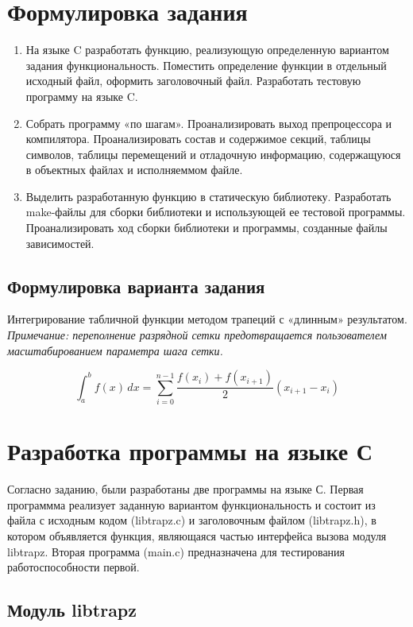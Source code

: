 






\section{Формулировка задания}
\begin{enumerate}
\item На языке C разработать функцию, реализующую определенную вариантом задания функциональность. Поместить определение функции в отдельный исходный файл, оформить заголовочный файл. Разработать тестовую программу на языке C.
\item Собрать программу «по шагам». Проанализировать выход препроцессора и компилятора. Проанализировать состав и содержимое секций, таблицы символов, таблицы перемещений и отладочную информацию, содержащуюся в объектных файлах и исполняеммом файле.
\item Выделить разработанную функцию в статическую библиотеку. Разработать make-файлы для сборки библиотеки и использующей ее тестовой программы. Проанализировать ход сборки библиотеки и программы, созданные файлы зависимостей.
\end{enumerate}

\subsection{ Формулировка варианта задания}
Интегрирование табличной функции методом трапеций с «длинным» результатом.
\textit{Примечание: переполнение разрядной сетки предотвращается пользователем масштабированием параметра шага сетки.}

\[ \int_{a}^{b} f(x) \,dx = \sum_{i=0}^{n-1} \frac{f(x_i) + f(x_{i+1})}{2}(x_{i+1}-x_i) \]

\section{Разработка программы на языке С}
Согласно заданию, были разработаны две программы на языке С. Первая программма реализует заданную вариантом функциональность и состоит из файла с исходным кодом (libtrapz.c) и заголовочным файлом (libtrapz.h), в котором объявляется функция, являющаяся частью интерфейса вызова модуля libtrapz. Вторая программа (main.c) предназначена для тестирования работоспособности первой.
\subsection{Модуль libtrapz}

\parindent=1cm %

